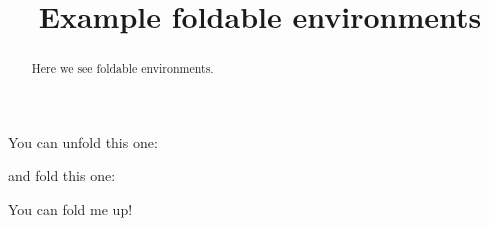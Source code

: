 \documentclass{ximera}
\title{Example foldable environments}
\begin{document}
\begin{abstract}
  Here we see foldable environments.
\end{abstract}
\maketitle

You can unfold this one:

\begin{unfoldable}
  \begin{center}
  \end{center}
\end{unfoldable}

and fold this one:

\begin{foldable}
  You can fold me up!
\end{foldable}
\end{document}
